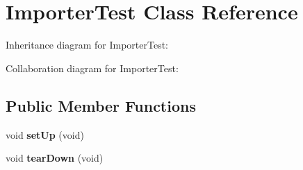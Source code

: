 \hypertarget{class_importer_test}{\section{Importer\+Test Class Reference}
\label{class_importer_test}
}


Inheritance diagram for Importer\+Test\+:


Collaboration diagram for Importer\+Test\+:
\subsection*{Public Member Functions}
\begin{DoxyCompactItemize}
\item 
\hypertarget{class_importer_test_a046920cf58e0456dfa9ba2eba5247e61}{void {\bfseries set\+Up} (void)}\label{class_importer_test_a046920cf58e0456dfa9ba2eba5247e61}

\item 
\hypertarget{class_importer_test_ab7707d1c341866981952dd1f51e29532}{void {\bfseries tear\+Down} (void)}\label{class_importer_test_ab7707d1c341866981952dd1f51e29532}

\end{DoxyCompactItemize}
